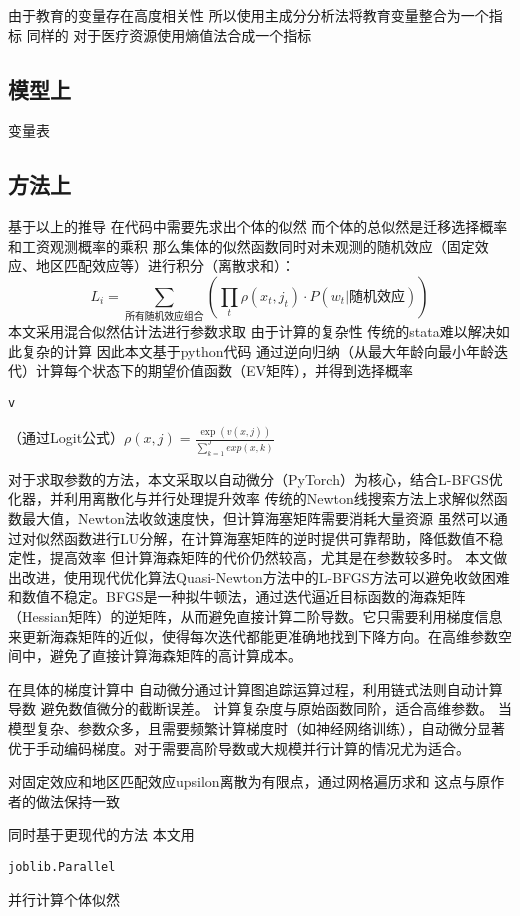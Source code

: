 \documentclass[10pt,a4paper]{article}
\begin{document}
由于教育的变量存在高度相关性
所以使用主成分分析法将教育变量整合为一个指标
同样的
对于医疗资源使用熵值法合成一个指标


\subsection{模型上}
变量表

\subsection{方法上} %
\label{sub:方法上}
基于以上的推导
在代码中需要先求出个体的似然
而个体的总似然是迁移选择概率和工资观测概率的乘积
那么集体的似然函数同时对未观测的随机效应（固定效应、地区匹配效应等）进行积分（离散求和）：
$$
L_{i}=\sum\limits_{\text{所有随机效应组合}}(\prod_{t}\rho(x_{t},j_{t})⋅P(w_{t}|\text{随机效应}))$$
本文采用混合似然估计法进行参数求取
由于计算的复杂性
传统的stata难以解决如此复杂的计算
因此本文基于python代码
通过逆向归纳（从最大年龄向最小年龄迭代）计算每个状态下的期望价值函数（EV矩阵），并得到选择概率\begin{verbatim}v\end{verbatim}（通过Logit公式）$\rho(x,j)=\frac{\exp(v(x,j))}{\sum\limits_{k=1}^{J} exp(x,k)}$


对于求取参数的方法，本文采取以自动微分（PyTorch）为核心，结合L-BFGS优化器，并利用离散化与并行处理提升效率
传统的Newton线搜索方法上求解似然函数最大值，Newton法收敛速度快，但计算海塞矩阵需要消耗大量资源
虽然可以通过对似然函数进行LU分解，在计算海塞矩阵的逆时提供可靠帮助，降低数值不稳定性，提高效率
但计算海森矩阵的代价仍然较高，尤其是在参数较多时。
本文做出改进，使用现代优化算法Quasi-Newton方法中的L-BFGS方法可以避免收敛困难和数值不稳定。BFGS是一种拟牛顿法，通过迭代逼近目标函数的海森矩阵（Hessian矩阵）的逆矩阵，从而避免直接计算二阶导数。它只需要利用梯度信息来更新海森矩阵的近似，使得每次迭代都能更准确地找到下降方向。在高维参数空间中，避免了直接计算海森矩阵的高计算成本。

在具体的梯度计算中
自动微分通过计算图追踪运算过程，利用链式法则自动计算导数
避免数值微分的截断误差。
计算复杂度与原始函数同阶，适合高维参数。
当模型复杂、参数众多，且需要频繁计算梯度时（如神经网络训练），自动微分显著优于手动编码梯度。对于需要高阶导数或大规模并行计算的情况尤为适合。

对固定效应和地区匹配效应upsilon离散为有限点，通过网格遍历求和
这点与原作者的做法保持一致

同时基于更现代的方法
本文用\begin{verbatim}joblib.Parallel\end{verbatim}并行计算个体似然
\end{document}
